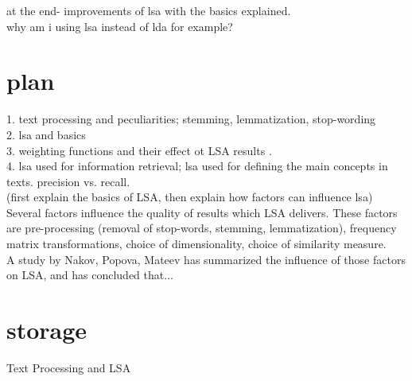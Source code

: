 at the end- improvements of lsa with the basics explained.\\
why am i using lsa instead of lda for example?\\
\section{plan}
\label{sec:lsa:plan}
1. text processing and peculiarities; stemming, lemmatization, stop-wording\\
2. lsa and basics\\
3. weighting functions and their effect ot LSA results \cite{Nakov_weightfunctions}. \\
4. lsa used for information retrieval; lsa used for defining the main concepts in texts. precision vs. recall. \\
(first explain the basics of LSA, then explain how factors can influence lsa)\\
Several factors influence the quality of results which LSA delivers. These factors are pre-processing (removal of stop-words, stemming, lemmatization), frequency matrix transformations, choice of dimensionality, choice of similarity measure.\\
A study by Nakov, Popova, Mateev\cite{Nakov_weightfunctions} has summarized the influence of those factors on LSA, and has concluded that...\\

\section{storage}
Text Processing and LSA\\

